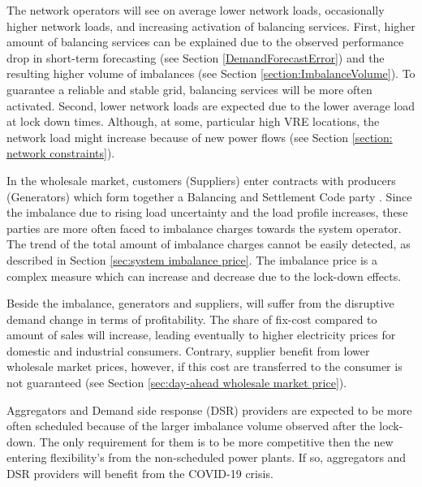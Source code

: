 \documentclass[energies,article,submit,moreauthors,pdftex]{Definitions/mdpi}
\begin{document}
The network operators will see on average lower network loads, occasionally higher network loads, and increasing activation of balancing services. First, higher amount of balancing services can be explained due to the observed performance drop in short-term forecasting (see Section \ref{DemandForecastError}) and the resulting higher volume of imbalances (see Section \ref{section:ImbalanceVolume}). To guarantee a reliable and stable grid, balancing services will be more often activated. Second, lower network loads are expected due to the lower average load at lock down times. Although, at some, particular high VRE locations, the network load might increase because of new power flows (see Section \ref{section: network constraints}).

In the wholesale market, customers (Suppliers) enter contracts with producers (Generators) which form together a Balancing and Settlement Code party \cite{ELEXON2019GuidanceBritain}. Since the imbalance due to rising load uncertainty and the load profile increases, these parties are more often faced to imbalance charges towards the system operator. The trend of the total amount of imbalance charges cannot be easily detected, as described in Section \ref{sec:system imbalance price}. The imbalance price is a complex measure which can increase and decrease due to the lock-down effects. 

Beside the imbalance, generators and suppliers, will suffer from the disruptive demand change in terms of profitability. The share of fix-cost compared to amount of sales will increase, leading eventually to higher electricity prices for domestic and industrial consumers. Contrary, supplier benefit from lower wholesale market prices, however, if this cost are transferred to the consumer is not guaranteed (see Section \ref{sec:day-ahead wholesale market price}).

Aggregators and Demand side response (DSR) providers are expected to be more often scheduled because of the larger imbalance volume observed after the lock-down. The only requirement for them is to be more competitive then the new entering flexibility's from the non-scheduled power plants. If so, aggregators and DSR providers will benefit from the COVID-19 crisis.

\end{document}
